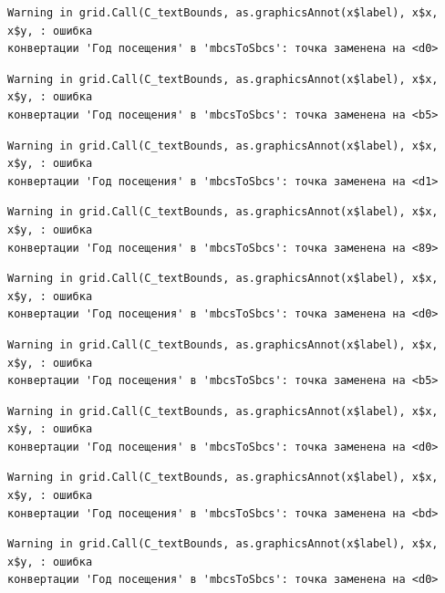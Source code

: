 \documentclass[
  letterpaper,
  DIV=11,
  numbers=noendperiod]{scrreprt}
\begin{document}
\begin{verbatim}
Warning in grid.Call(C_textBounds, as.graphicsAnnot(x$label), x$x, x$y, : ошибка
конвертации 'Год посещения' в 'mbcsToSbcs': точка заменена на <d0>
\end{verbatim}

\begin{verbatim}
Warning in grid.Call(C_textBounds, as.graphicsAnnot(x$label), x$x, x$y, : ошибка
конвертации 'Год посещения' в 'mbcsToSbcs': точка заменена на <b5>
\end{verbatim}

\begin{verbatim}
Warning in grid.Call(C_textBounds, as.graphicsAnnot(x$label), x$x, x$y, : ошибка
конвертации 'Год посещения' в 'mbcsToSbcs': точка заменена на <d1>
\end{verbatim}

\begin{verbatim}
Warning in grid.Call(C_textBounds, as.graphicsAnnot(x$label), x$x, x$y, : ошибка
конвертации 'Год посещения' в 'mbcsToSbcs': точка заменена на <89>
\end{verbatim}

\begin{verbatim}
Warning in grid.Call(C_textBounds, as.graphicsAnnot(x$label), x$x, x$y, : ошибка
конвертации 'Год посещения' в 'mbcsToSbcs': точка заменена на <d0>
\end{verbatim}

\begin{verbatim}
Warning in grid.Call(C_textBounds, as.graphicsAnnot(x$label), x$x, x$y, : ошибка
конвертации 'Год посещения' в 'mbcsToSbcs': точка заменена на <b5>
\end{verbatim}

\begin{verbatim}
Warning in grid.Call(C_textBounds, as.graphicsAnnot(x$label), x$x, x$y, : ошибка
конвертации 'Год посещения' в 'mbcsToSbcs': точка заменена на <d0>
\end{verbatim}

\begin{verbatim}
Warning in grid.Call(C_textBounds, as.graphicsAnnot(x$label), x$x, x$y, : ошибка
конвертации 'Год посещения' в 'mbcsToSbcs': точка заменена на <bd>
\end{verbatim}

\begin{verbatim}
Warning in grid.Call(C_textBounds, as.graphicsAnnot(x$label), x$x, x$y, : ошибка
конвертации 'Год посещения' в 'mbcsToSbcs': точка заменена на <d0>
\end{verbatim}
\end{document}
